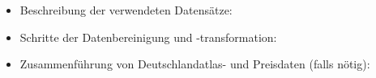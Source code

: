 \begin{itemize}
    \item Beschreibung der verwendeten Datensätze:
    \item Schritte der Datenbereinigung und -transformation:
    \item Zusammenführung von Deutschlandatlas- und Preisdaten (falls nötig):
\end{itemize}